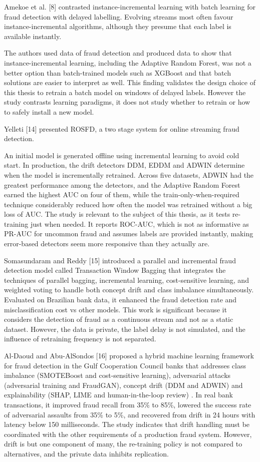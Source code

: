 \documentclass[11pt,letterpaper]{report}
\begin{document}
Amekoe et al. [8] contrasted instance-incremental learning with batch learning for fraud detection with delayed labelling. Evolving streams most often favour instance-incremental algorithms, although they presume that each label is available instantly.

The authors used data of fraud detection and produced data to show that instance-incremental learning, including the Adaptive Random Forest, was not a better option than batch-trained models such as XGBoost and that batch solutions are easier to interpret as well. This finding validates the design choice of this thesis to retrain a batch model on windows of delayed labels. However the study contrasts learning paradigms, it does not study whether to retrain or how to safely install a new model.

Yelleti [14] presented ROSFD, a two stage system for online streaming fraud detection.

An initial model is generated offline using incremental learning to avoid cold start. In production, the drift detectors DDM, EDDM and ADWIN determine when the model is incrementally retrained. Across five datasets, ADWIN had the greatest performance among the detectors, and the Adaptive Random Forest earned the highest AUC on four of them, while the train-only-when-required technique considerably reduced how often the model was retrained without a big loss of AUC. The study is relevant to the subject of this thesis, as it tests re-training just when needed. It reports ROC-AUC, which is not as informative as PR-AUC for uncommon fraud and assumes labels are provided instantly, making error-based detectors seem more responsive than they actually are.

Somasundaram and Reddy [15] introduced a parallel and incremental fraud detection model called Transaction Window Bagging that integrates the techniques of parallel bagging, incremental learning, cost-sensitive learning, and weighted voting to handle both concept drift and class imbalance simultaneously. Evaluated on Brazilian bank data, it enhanced the fraud detection rate and misclassification cost vs other models. This work is significant because it considers the detection of fraud as a continuous stream and not as a static dataset. However, the data is private, the label delay is not simulated, and the influence of retraining frequency is not separated.

Al-Daoud and Abu-AlSondos [16] proposed a hybrid machine learning framework for fraud detection in the Gulf Cooperation Council banks that addresses class imbalance (SMOTEBoost and cost-sensitive learning), adversarial attacks (adversarial training and FraudGAN), concept drift (DDM and ADWIN) and explainability (SHAP, LIME and human-in-the-loop review) . In real bank transactions, it improved fraud recall from 35\% to 85\%, lowered the success rate of adversarial assaults from 35\% to 5\%, and recovered from drift in 24 hours with latency below 150 milliseconds. The study indicates that drift handling must be coordinated with the other requirements of a production fraud system. However, drift is but one component of many, the re-training policy is not compared to alternatives, and the private data inhibits replication.
\end{document}
